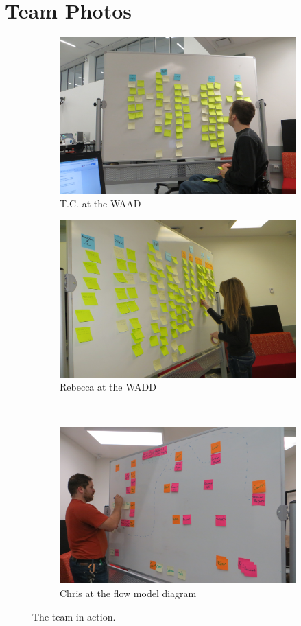 \documentclass[12pt]{article} %
\begin{document}
\section{Team Photos} %
  \begin{figure}[H]
  \begin{subfigure}{.5\linewidth}
  \centering
  \includegraphics[width=0.95\linewidth]{TeamAtWork1}
  \caption{T.C. at the WAAD}
  \label{fig:team_photo_1}
  \end{subfigure}%
  \begin{subfigure}{.5\linewidth}
  \centering
  \includegraphics[width=0.95\linewidth]{TeamAtWork3}
  \caption{Rebecca at the WADD}
  \label{fig:team_photo_3}
  \end{subfigure}\\[1ex]
  \begin{subfigure}{\linewidth}
  \centering
  \includegraphics[width=0.55\linewidth]{TeamAtWork4}
  \caption{Chris at the flow model diagram}
  \label{fig:team_photo_4}
  \end{subfigure}
  \caption{The team in action.}
  \label{fig:test}
  \end{figure}
\end{document}

